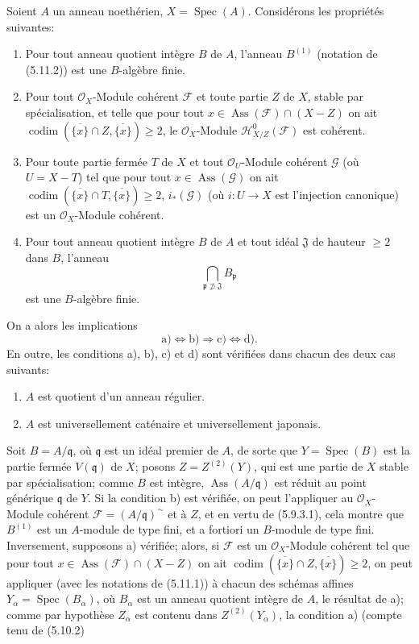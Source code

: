 \begin{corollary}[5.11.6]
\label{IV.2.s5.11.6-fr}
Soient $A$ un anneau noethérien, $X=\operatorname{Spec}(A)$. Considérons les
propriétés suivantes:
\begin{enumerate}
\item[a)] Pour tout anneau quotient intègre $B$ de $A$, l'anneau $B^{(1)}$
(notation de (5.11.2)) est une $B$-algèbre finie.
\item[b)] Pour tout $\mathcal O_X$-Module cohérent $\mathcal F$ et toute partie
$Z$ de $X$, stable par spécialisation, et telle que pour tout
$x\in\operatorname{Ass}(\mathcal F)\cap(X-Z)$ on ait
$\operatorname{codim}(\overline{\{x\}}\cap Z,\overline{\{x\}})\geq2$, le
$\mathcal O_X$-Module $\mathcal H^0_{X/Z}(\mathcal F)$ est cohérent.
\item[c)] Pour toute partie fermée $T$ de $X$ et tout $\mathcal O_U$-Module
cohérent $\mathcal G$ (où $U=X-T$) tel que pour tout
$x\in\operatorname{Ass}(\mathcal G)$ on ait
$\operatorname{codim}(\overline{\{x\}}\cap T,\overline{\{x\}})\geq2$,
$i_*(\mathcal G)$ (où $i:U\to X$ est l'injection canonique) est un
$\mathcal O_X$-Module cohérent.
\item[d)] Pour tout anneau quotient intègre $B$ de $A$ et tout idéal
$\mathfrak J$ de hauteur $\geq2$ dans $B$, l'anneau
\[
\bigcap_{\mathfrak p\not\supset\mathfrak J}B_\mathfrak p
\]
est une $B$-algèbre finie.
\end{enumerate}
On a alors les implications
\[
\mathrm a)\Longleftrightarrow\mathrm b)\Longrightarrow\mathrm c)
\Longleftrightarrow\mathrm d).
\]
En outre, les conditions a), b), c) et d) sont vérifiées dans chacun des deux
cas suivants:
\begin{enumerate}
\item[(i)] $A$ est quotient d'un anneau régulier.
\item[(ii)] $A$ est universellement caténaire et universellement japonais.
\end{enumerate}
\end{corollary}

Soit $B=A/\mathfrak q$, où $\mathfrak q$ est un idéal premier de $A$, de sorte
que $Y=\operatorname{Spec}(B)$ est la partie fermée $V(\mathfrak q)$ de $X$;
posons $Z=Z^{(2)}(Y)$, qui est une partie de $X$ stable par spécialisation;
comme $B$ est intègre, $\operatorname{Ass}(A/\mathfrak q)$ est réduit au point
générique $\mathfrak q$ de $Y$. Si la condition b) est vérifiée, on peut
l'appliquer au $\mathcal O_X$-Module cohérent
$\mathcal F=(A/\mathfrak q)^\sim$ et à $Z$, et en vertu de (5.9.3.1), cela
montre que $B^{(1)}$ est un $A$-module de type fini, et a fortiori un
$B$-module de type fini. Inversement, supposons a) vérifiée; alors, si
$\mathcal F$ est un $\mathcal O_X$-Module cohérent tel que pour tout
$x\in\operatorname{Ass}(\mathcal F)\cap(X-Z)$ on ait
$\operatorname{codim}(\overline{\{x\}}\cap Z,\overline{\{x\}})\geq2$, on peut
appliquer (avec les notations de (5.11.1)) à chacun des schémas affines
$Y_\alpha=\operatorname{Spec}(B_\alpha)$, où $B_\alpha$ est un anneau quotient
intègre de $A$, le résultat de a); comme par hypothèse $Z_\alpha$ est contenu
dans $Z^{(2)}(Y_\alpha)$, la condition a) (compte tenu de (5.10.2)

